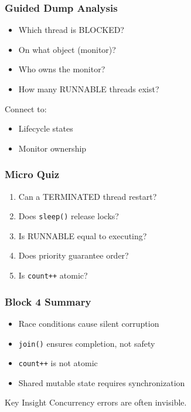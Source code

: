 \documentclass[aspectratio=169,11pt]{beamer}
\begin{document}
	\begin{frame}
		\frametitle{Guided Dump Analysis}
		\begin{itemize}
			\item Which thread is BLOCKED?
			\item On what object (monitor)?
			\item Who owns the monitor?
			\item How many RUNNABLE threads exist?
		\end{itemize}
		\vspace{5mm}
		Connect to:
		\begin{itemize}
			\item Lifecycle states
			\item Monitor ownership
		\end{itemize}
	\end{frame}
	
	\begin{frame}
		\frametitle{Micro Quiz}
		\begin{enumerate}
			\item Can a TERMINATED thread restart?
			\item Does \texttt{sleep()} release locks?
			\item Is RUNNABLE equal to executing?
			\item Does priority guarantee order?
			\item Is \texttt{count++} atomic?
		\end{enumerate}
	\end{frame}
	
	\begin{frame}
		\frametitle{Block 4 Summary}
		\begin{itemize}
			\item Race conditions cause silent corruption
			\item \texttt{join()} ensures completion, not safety
			\item \texttt{count++} is not atomic
			\item Shared mutable state requires synchronization
		\end{itemize}
		\vspace{5mm}
		\begin{block}{Key Insight}
			Concurrency errors are often invisible.
		\end{block}
	\end{frame}
	
\end{document}
